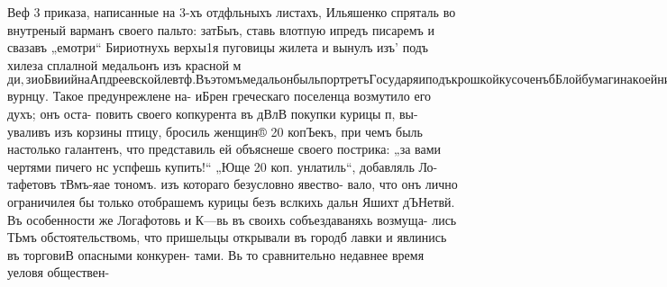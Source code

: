 {Веф 3 приказа, написанные на 3-хъ отдфльныхъ листахъ,
Ильяшенко спряталь во внутреный варманъ своего пальто:
затБыъ, ставь влотпую ипредъ писаремъ и свазавъ „емотри“
Бириотнухь верхы1я пуговицы жилета и вынулъ изъ’ подъ
хилеза сплалной медальонъ изъ красной м$ди, зиоБвиий на
Апдреевской левтф. Въ этомъ медальон быль портретъ
Государя и подъ крошкой кусоченъ бБлой бумаги на коей
ниВлаеь надииеь: „быть по сему, Алексанаръ 2-й, Царское
село, 17 мая №302 года“. Эти слова были написаны обык-
новеннымь почеркомъ Пльяшепко, кавъ это удостовбрено
судебной экспертизой п гакъ это было очевидно впослёдетвия
лля воякаго обозрфвавшато вастоящую подпись. (Я урналь рз-
шений Юкалер. Налаты угол. суда за 1565 года, л. 39).

„Смотри“, товориль Ильяшенко; настуная на писаря;
„ты знаешь, кто я таковъ, видить, чфмъ я вагражденъ отъ
Государя. Зпай, что сели ты изофетили, начальника комавдхы

ревийв мною суда, сегодня же будешь повфшенъ“! ©ъ
этими словами, произнесенными съ зловфщимъ грознымъ пто-
потомъ, Ильяшенко быстро вышель изъ канцеляри. У пи-
саря отнялея духъ, опять потемифло въ глазахь, застучало
въ толовВ: не донести начальнику— Ода, донестя еще хуже,
мелькнуло въ его сознан!и; недвижныый, словно окаменфлый,
остадея онъ въ своей канцеляр!и, вакъ будто тысяча желфз-
нахъ цфней приковали его къ мЪету.

Николай Оомевичь Логафетовъ, не обративъ никакого
вниманя на угрозу почти вытолкнутага имъ изъ своего дома
Изьншенко, па утро совершенно о немъ позабыль. Шо обык-
новеню хоропго выспавшись, онъ веталь рано не спёша сталь
одфваться, поверхностно умылея и преданея спокойному чае-
пит ю. Часовъ около 10 утра онъ отправился въ сосЪлнюю
лавку своего приятеля В....нова, гдф онъ бываль каждое утро
и тдф каждое утро пруятели вели одинъ и тоть же разговоръ.
Во 1-хъ, они говорили, что жилось бы гораздо лучше, если
бы всегда можно было быть увфренныхъь купить товарь де-
шево и продать дорого. Во 2-хъ, оба они печаловались друг
другу 0 томъ, что вь МаруполВ начинають селитьея при-
шельцы изъ разныхъь концовь Импери, не греки; за ними,
говорили между 060ю приятели, и на базар не успфешь
пичего купить; при этомъ они вспоминали, какъ остроумно
ихъ общй другъ, иышй мфетный обыватель, выразиль про-
тестъ противъ тапого вошющаго положеня вещей. Этоть ихъ
пругъ, идя на базаръ купить курицу, увпдфле, что одна изъ
вновь поселивигихея русевихъь женщинъ возвращалась съ ба-
зара и несла въ корзин$ вурнцу. Такое предунрежлене на-
иБрен греческаго поселенца возмутило его духъ; онъ оста-
повить своего копкурента въ дВлВ покупки курицы п, вы-
уваливъ изъ корзины птицу, бросиль женщин® 20 копЪекъ,
при чемъ быль настолько галантенъ, что представиль ей
объяснеше своего пострика: „за вами чертями пичего нс
успфешь купить!“ „Юще 20 коп. унлатиль“, добавляль Ло-
тафетовъ тВмъ-яае тономъ. изъ котораго безусловно явество-
вало, что онъ лично ограничилея бы только отобрашемъ
курицы безъ вслкихь дальн Яшихт дЪНетвй. Въ особенности
же Логафотовь и К—вь въ своихь собъездаваняхь возмуща-
лись ТЬмъ обстоятельствомь, что пришельцы открывали въ
городб лавки и явлинись въ торговиВ опасными конкурен-
тами. Вь то сравнительно недавнее время уеловя обществен-

}
